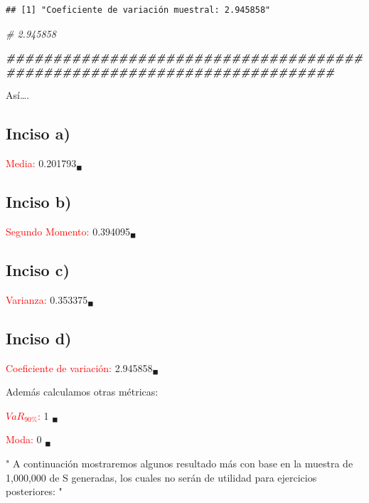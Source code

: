 \documentclass[
]{article}
\newenvironment{Shaded}{\begin{snugshade}}{\end{snugshade}}
\newcommand{\CommentTok}[1]{\textcolor[rgb]{0.56,0.35,0.01}{\textit{#1}}}
\newcommand{\DocumentationTok}[1]{\textcolor[rgb]{0.56,0.35,0.01}{\textbf{\textit{#1}}}}
\newcommand{\StringTok}[1]{\textcolor[rgb]{0.31,0.60,0.02}{#1}}
\begin{document}
\begin{verbatim}
## [1] "Coeficiente de variación muestral: 2.945858"
\end{verbatim}

\begin{Shaded}
\begin{Highlighting}[]
\CommentTok{\# 2.945858}

\DocumentationTok{\#\#\#\#\#\#\#\#\#\#\#\#\#\#\#\#\#\#\#\#\#\#\#\#\#\#\#\#\#\#\#\#\#\#\#\#\#\#\#\#\#\#\#\#\#\#\#\#\#\#\#\#\#\#\#\#\#\#\#\#\#\#\#\#\#\#\#\#\#\#\#\#\#}
\end{Highlighting}
\end{Shaded}

Así\ldots.

\hypertarget{inciso-a-3}{%
\subsection{Inciso a)}\label{inciso-a-3}}

\textcolor{red}{Media:} 0.201793\(_\blacksquare\)

\hypertarget{inciso-b-2}{%
\subsection{Inciso b)}\label{inciso-b-2}}

\textcolor{red}{Segundo Momento:} 0.394095\(_\blacksquare\)

\hypertarget{inciso-c-2}{%
\subsection{Inciso c)}\label{inciso-c-2}}

\textcolor{red}{Varianza:} 0.353375\(_\blacksquare\)

\hypertarget{inciso-d-2}{%
\subsection{Inciso d)}\label{inciso-d-2}}

\textcolor{red}{Coeficiente de variación:} 2.945858\(_\blacksquare\)

Además calculamos otras métricas:

\textcolor{red}{$VaR_{90\%}$:} 1 \(_\blacksquare\)

\textcolor{red}{Moda:} 0 \(_\blacksquare\)

\begin{Shaded}
\begin{Highlighting}[]
\StringTok{"}
\StringTok{A continuación mostraremos algunos resultado más con base en la muestra de }
\StringTok{1,000,000 de S generadas, los cuales no serán de utilidad para ejercicios }
\StringTok{posteriores:}
\StringTok{"}
\end{Highlighting}
\end{Shaded}
\end{document}
